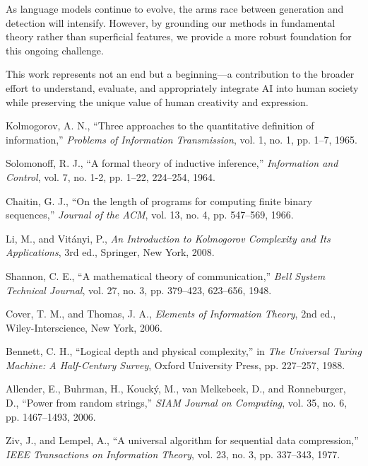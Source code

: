 \documentclass[12pt,a4paper]{report}
\begin{document}
As language models continue to evolve, the arms race between generation and detection will intensify. However, by grounding our methods in fundamental theory rather than superficial features, we provide a more robust foundation for this ongoing challenge.

This work represents not an end but a beginning—a contribution to the broader effort to understand, evaluate, and appropriately integrate AI into human society while preserving the unique value of human creativity and expression.


\begin{thebibliography}{99}

Kolmogorov, A. N., ``Three approaches to the quantitative definition of information,'' \textit{Problems of Information Transmission}, vol. 1, no. 1, pp. 1--7, 1965.

Solomonoff, R. J., ``A formal theory of inductive inference,'' \textit{Information and Control}, vol. 7, no. 1-2, pp. 1--22, 224--254, 1964.

Chaitin, G. J., ``On the length of programs for computing finite binary sequences,'' \textit{Journal of the ACM}, vol. 13, no. 4, pp. 547--569, 1966.

Li, M., and Vitányi, P., \textit{An Introduction to Kolmogorov Complexity and Its Applications}, 3rd ed., Springer, New York, 2008.

Shannon, C. E., ``A mathematical theory of communication,'' \textit{Bell System Technical Journal}, vol. 27, no. 3, pp. 379--423, 623--656, 1948.

Cover, T. M., and Thomas, J. A., \textit{Elements of Information Theory}, 2nd ed., Wiley-Interscience, New York, 2006.

Bennett, C. H., ``Logical depth and physical complexity,'' in \textit{The Universal Turing Machine: A Half-Century Survey}, Oxford University Press, pp. 227--257, 1988.

Allender, E., Buhrman, H., Koucký, M., van Melkebeek, D., and Ronneburger, D., ``Power from random strings,'' \textit{SIAM Journal on Computing}, vol. 35, no. 6, pp. 1467--1493, 2006.

Ziv, J., and Lempel, A., ``A universal algorithm for sequential data compression,'' \textit{IEEE Transactions on Information Theory}, vol. 23, no. 3, pp. 337--343, 1977.


\end{thebibliography}
\end{document}
